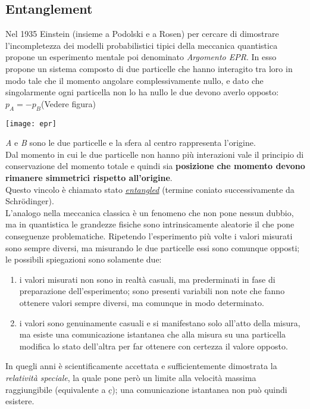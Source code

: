 \subsection{Entanglement}
\label{sec:entanglement}
Nel 1935 Einstein (insieme a Podolski e a Rosen) per cercare di dimostrare l'incompletezza dei modelli probabilistici tipici della meccanica quantistica propone un esperimento mentale poi denominato \textit{Argomento EPR}.
In esso propone un sistema composto di due particelle che hanno interagito tra loro in modo tale che il momento angolare complessivamente nullo, e dato che singolarmente ogni particella non lo ha nullo le due devono averlo opposto: $p_A=-p_B$(Vedere figura)
\begin{center}
\texttt{[image: epr]}
\end{center}
\textit{A} e \textit{B} sono le due particelle e la sfera al centro rappresenta l'origine.\\
Dal momento in cui le due particelle non hanno più interazioni vale il principio di conservazione del momento totale e quindi sia \textbf{posizione che momento devono rimanere simmetrici rispetto all'origine}.\\
Questo vincolo è chiamato stato \underline{\textit{entangled}} (termine coniato successivamente da Schr\"{o}dinger).\\
L'analogo nella meccanica classica è un fenomeno che non pone nessun dubbio, ma in quantistica le grandezze fisiche sono intrinsicamente aleatorie il che pone conseguenze problematiche.
Ripetendo l'esperimento più volte i valori misurati sono sempre diversi, ma misurando le due particelle essi sono comunque opposti; le possibili spiegazioni sono solamente due:
\begin{enumerate}
\item i valori misurati non sono in realtà casuali, ma prederminati in fase di preparazione dell'esperimento; sono presenti variabili non note che fanno ottenere valori sempre diversi, ma comunque in modo determinato.
\item i valori sono genuinamente casuali e si manifestano solo all'atto della misura, ma esiste una comunicazione istantanea che alla misura su una particella modifica lo stato dell'altra per far ottenere con certezza il valore opposto.
\end{enumerate}
In quegli anni è scientificamente accettata e sufficientemente dimostrata la \textit{relatività speciale}, la quale pone però un limite alla velocità massima raggiungibile (equivalente a $\underline{c}$); una comunicazione istantanea non può quindi esistere.\\

